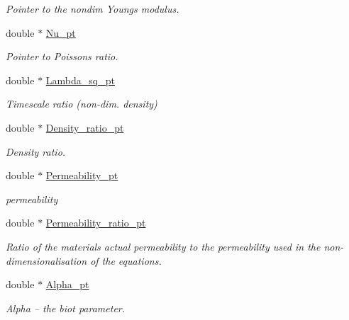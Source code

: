 \begin{DoxyCompactItemize}
\begin{DoxyCompactList}\small\item\em Pointer to the nondim Young\textquotesingle{}s modulus. \end{DoxyCompactList}\item 
double $\ast$ \hyperlink{classoomph_1_1AxisymmetricPoroelasticityEquations_a50ce35e6b58e7ace1b741cbfb08babfc}{Nu\+\_\+pt}
\begin{DoxyCompactList}\small\item\em Pointer to Poisson\textquotesingle{}s ratio. \end{DoxyCompactList}\item 
double $\ast$ \hyperlink{classoomph_1_1AxisymmetricPoroelasticityEquations_a1688d9a67fca3b562a7a94fca4be82dc}{Lambda\+\_\+sq\+\_\+pt}
\begin{DoxyCompactList}\small\item\em Timescale ratio (non-\/dim. density) \end{DoxyCompactList}\item 
double $\ast$ \hyperlink{classoomph_1_1AxisymmetricPoroelasticityEquations_aed5ac193baa2b0920ec5d454ac5a0ed1}{Density\+\_\+ratio\+\_\+pt}
\begin{DoxyCompactList}\small\item\em Density ratio. \end{DoxyCompactList}\item 
double $\ast$ \hyperlink{classoomph_1_1AxisymmetricPoroelasticityEquations_a96e87d7c35fbc811ca158fcca346323d}{Permeability\+\_\+pt}
\begin{DoxyCompactList}\small\item\em permeability \end{DoxyCompactList}\item 
double $\ast$ \hyperlink{classoomph_1_1AxisymmetricPoroelasticityEquations_ad43355d8645e408d131a0042b3f2c881}{Permeability\+\_\+ratio\+\_\+pt}
\begin{DoxyCompactList}\small\item\em Ratio of the material\textquotesingle{}s actual permeability to the permeability used in the non-\/dimensionalisation of the equations. \end{DoxyCompactList}\item 
double $\ast$ \hyperlink{classoomph_1_1AxisymmetricPoroelasticityEquations_a50497ecb81cecd155a974dca038e6cce}{Alpha\+\_\+pt}
\begin{DoxyCompactList}\small\item\em Alpha -- the biot parameter. \end{DoxyCompactList}\item 

\end{DoxyCompactItemize}

